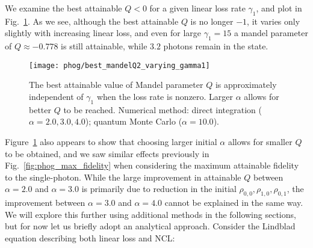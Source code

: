 We examine the best attainable $Q<0$ for a given linear loss rate $\gamma_1$, and plot in Fig.~\ref{fig:phog_ncl_best_Q_gamma1}. As we see, although the best attainable $Q$ is no longer $-1$, it varies only slightly with increasing linear loss, and even for large $\gamma_1=15$ a mandel parameter of $Q \approx -0.778$ is still attainable, while $3.2$ photons remain in the state.


\begin{figure}
\captionsetup{width=0.8\linewidth}
\centering
\texttt{[image: phog/best\_mandelQ2\_varying\_gamma1]}
\caption{\label{fig:phog_ncl_best_Q_gamma1} The best attainable value of Mandel parameter $Q$ is approximately independent of $\gamma_1$ when the loss rate is nonzero. Larger $\alpha$ allows for better $Q$ to be reached. Numerical method: direct integration ($\alpha = 2.0, 3.0, 4.0$); quantum Monte Carlo ($\alpha = 10.0$).}
\end{figure}

Figure~\ref{fig:phog_ncl_best_Q_gamma1} also appears to show that choosing larger initial $\alpha$ allows for smaller $Q$ to be obtained, and we saw similar effects previously in Fig.~\ref{fig:phog_max_fidelity} when considering the maximum attainable fidelity to the single-photon. While the large improvement in attainable $Q$ between $\alpha=2.0$ and $\alpha=3.0$ is primarily due to reduction in the initial $\rho_{0, 0}, \rho_{1, 0}, \rho_{0, 1}$, the improvement between $\alpha=3.0$ and $\alpha=4.0$ cannot be explained in the same way. We will explore this further using additional methods in the following sections, but for now let us briefly adopt an analytical approach. Consider the Lindblad equation describing both linear loss and NCL:

